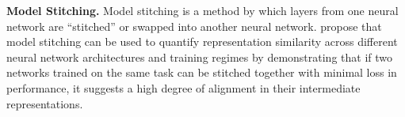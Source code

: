 \textbf{Model Stitching.} Model stitching is a method by which layers from one neural network are ``stitched'' or swapped into another neural network. \citet{lenc2015understanding, bansal2021revisiting} propose that model stitching can be used to quantify representation similarity across different neural network architectures and training regimes by demonstrating that if two networks trained on the same task can be stitched together with minimal loss in performance, it suggests a high degree of alignment in their intermediate representations.